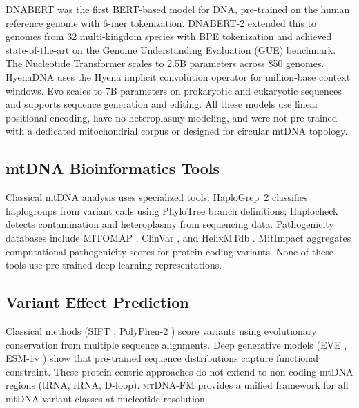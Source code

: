 \documentclass[10pt]{article}
\newcommand{\mtdnafm}{\textsc{mtDNA-FM}\xspace}
\begin{document}
DNABERT \citep{ji2021dnabert} was the first BERT-based model for DNA, pre-trained on the human
reference genome with 6-mer tokenization. DNABERT-2 \citep{zhou2024dnabert2} extended this to
genomes from 32 multi-kingdom species with BPE tokenization and achieved state-of-the-art
on the Genome Understanding Evaluation (GUE) benchmark. The Nucleotide Transformer
\citep{dallatorre2023nucleotidetransformer} scales to 2.5B parameters across 850 genomes.
HyenaDNA \citep{nguyen2023hyenadna} uses the Hyena implicit convolution operator for
million-base context windows. Evo \citep{nguyen2024evo} scales to 7B parameters on prokaryotic
and eukaryotic sequences and supports sequence generation and editing. All these models use linear
positional encoding, have no heteroplasmy modeling, and were not pre-trained with a dedicated
mitochondrial corpus or designed for circular mtDNA topology.

\subsection{mtDNA Bioinformatics Tools}

Classical mtDNA analysis uses specialized tools: HaploGrep~2 \citep{weissensteiner2016haplogrep}
classifies haplogroups from variant calls using PhyloTree \citep{vanoven2009phylotree} branch
definitions; Haplocheck \citep{weissensteiner2021haplocheck} detects contamination and
heteroplasmy from sequencing data. Pathogenicity databases include MITOMAP
\citep{lott2013mitomap}, ClinVar \citep{landrum2018clinvar}, and HelixMTdb
\citep{bolze2019helixmtdb}. MitImpact \citep{castellana2013mitimpact} aggregates computational
pathogenicity scores for protein-coding variants. None of these tools use pre-trained deep
learning representations.

\subsection{Variant Effect Prediction}

Classical methods (SIFT \citep{ng2003sift}, PolyPhen-2 \citep{adzhubei2010polyphen}) score
variants using evolutionary conservation from multiple sequence alignments. Deep generative
models (EVE \citep{frazer2021eve}, ESM-1v \citep{meier2021esm1v}) show that pre-trained
sequence distributions capture functional constraint. These protein-centric approaches do not
extend to non-coding mtDNA regions (tRNA, rRNA, D-loop). \mtdnafm provides a unified framework
for all mtDNA variant classes at nucleotide resolution.
\end{document}
